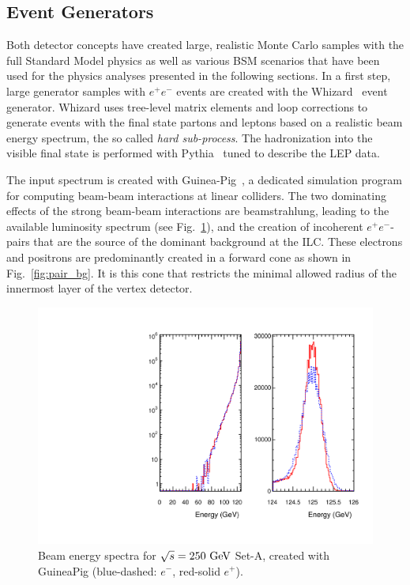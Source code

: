 \subsection{\label{sub:sw-generators}Event Generators}

Both detector concepts have created large, realistic Monte Carlo samples with the full Standard Model physics as well as various
BSM scenarios that have been used for the physics analyses presented in the following sections.
In a first step, large generator samples with $e^+e^-$ 
events are created with the Whizard~\cite{Kilian:2007gr} event generator.
Whizard uses tree-level matrix elements and loop corrections to generate events with the final state partons and leptons
based on a realistic beam energy spectrum, the so called \emph{hard sub-process}. The hadronization into the visible final state
is performed with Pythia~\cite{Sjostrand:2006za} tuned to describe the LEP data.

The input spectrum is created with Guinea-Pig~\cite{Schulte:1998au}, a dedicated simulation program for computing
beam-beam interactions at linear colliders. The two dominating effects of the strong beam-beam interactions are 
beamstrahlung, leading to the available luminosity spectrum (see Fig.~\ref{fig:lumi_spectrum}), and the creation of
incoherent $e^+e^-$-pairs that are the source of the dominant
background at the ILC. 
These electrons and positrons
are predominantly created in a forward cone as shown in Fig.~\ref{fig:pair_bg}. It is this cone that restricts the minimal
allowed radius of the innermost layer of the vertex detector.

\begin{figure}
\begin{center}
\includegraphics[width=1.\hsize]{chapters/figures/beam_spectrum_gp_250Gev_SetA.pdf}
\end{center}
\caption{Beam energy spectra for $\sqrt{s}=250~\rm{GeV}$ Set-A, created with GuineaPig (blue-dashed: $e^-$, red-solid $e^+$).}
\label{fig:lumi_spectrum}
\end{figure}

